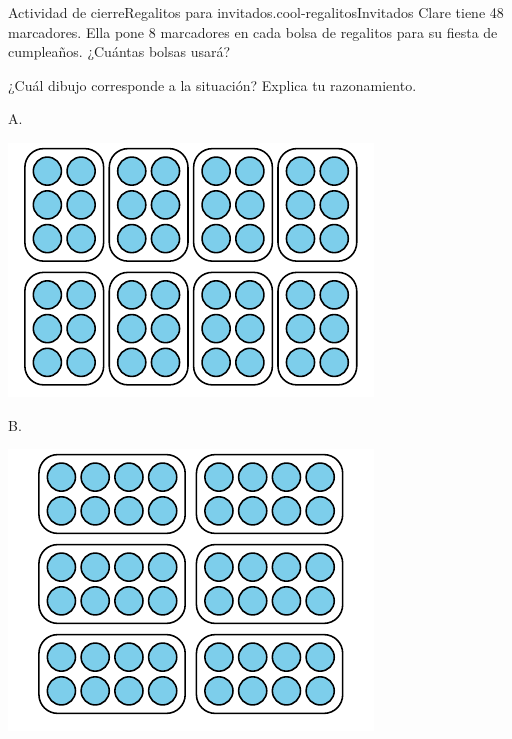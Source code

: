 \documentclass[14pt]{extarticle}
\begin{document}
\begin{project}{Actividad de cierre}{Regalitos para invitados.}{cool-regalitosInvitados}%
Clare tiene 48 marcadores. Ella pone 8 marcadores en cada bolsa de regalitos para su fiesta de cumpleaños. ¿Cuántas bolsas usará?%
\par
¿Cuál dibujo corresponde a la situación? Explica tu razonamiento.%
\begin{sidebyside}{2}{0}{0}{0}%
\begin{sbspanel}{0.5}%
A.%
\par
\includegraphics[max width=\linewidth, center]{external/svg-source/tikz-file-246306.pdf}
\end{sbspanel}%
\begin{sbspanel}{0.5}%
B.%
\par
\includegraphics[max width=\linewidth, center]{external/svg-source/tikz-file-246307.pdf}

\end{sbspanel}
\end{sidebyside}
\end{project}
\end{document}
